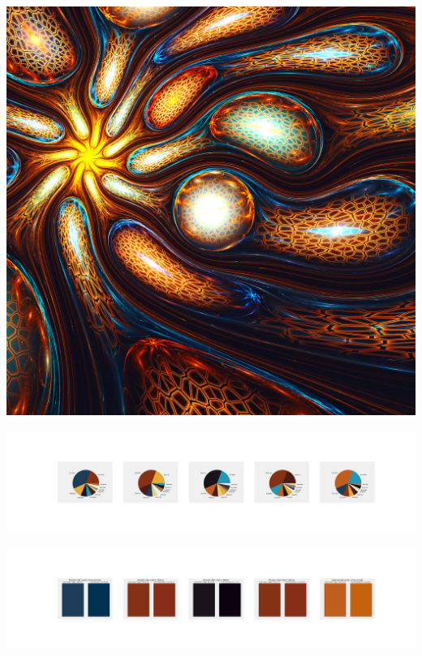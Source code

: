\documentclass[11pt]{article}
\begin{document}
\begin{landscape}
    \begin{center}
    \includegraphics[width=\textwidth]{./nbimg/file (297).jpg}
    \end{center}

    \begin{center}
    \includegraphics[width=250mm]{./nbimg/pie-219.jpg}
    \end{center}

    \begin{center}
    \includegraphics[width=250mm]{./nbimg/peak-219.jpg}
    \end{center}
    


\end{landscape}
\end{document}
